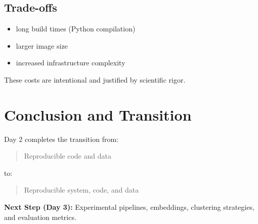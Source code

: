 \documentclass[11pt, a4paper]{article}
\begin{document}
\subsection{Trade-offs}
\begin{itemize}
    \item long build times (Python compilation)
    \item larger image size
    \item increased infrastructure complexity
\end{itemize}

These costs are intentional and justified by scientific rigor.

\section{Conclusion and Transition}

Day 2 completes the transition from:
\begin{quote}
Reproducible code and data
\end{quote}
to:
\begin{quote}
Reproducible system, code, and data
\end{quote}

\textbf{Next Step (Day 3):} Experimental pipelines, embeddings, clustering strategies, and evaluation metrics.
\end{document}
